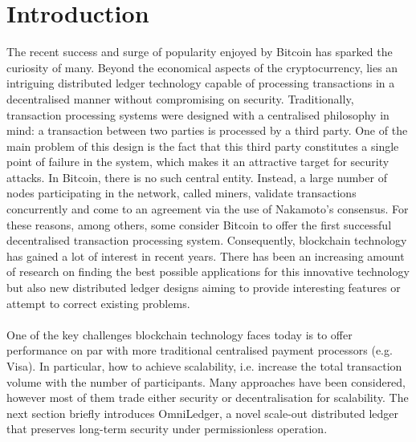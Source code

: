 \section{Introduction} \label{intro}
The recent success and surge of popularity enjoyed by Bitcoin has sparked the curiosity of many. Beyond the economical aspects of the cryptocurrency, lies an intriguing distributed ledger technology capable of processing transactions in a decentralised manner without compromising on security. Traditionally, transaction processing systems were designed with a centralised philosophy in mind: a transaction between two parties is processed by a third party. One of the main problem of this design is the fact that this third party constitutes a single point of failure in the system, which makes it an attractive target for security attacks. In Bitcoin, there is no such central entity. Instead, a large number of nodes participating in the network, called miners, validate transactions concurrently and come to an agreement via the use of Nakamoto's consensus. For these reasons, among others, some consider Bitcoin to offer the first successful decentralised transaction processing system.
Consequently, blockchain technology has gained a lot of interest in recent years. There has been an increasing amount of research on finding the best possible applications for this innovative technology but also new distributed ledger designs aiming to provide interesting features or attempt to correct existing problems. \\\\
One of the key challenges blockchain technology faces today is to offer performance on par with more traditional centralised payment processors (e.g. Visa). In particular, how to achieve scalability, i.e. increase the total transaction volume with the number of participants. Many approaches have been considered, however most of them trade either security or decentralisation for scalability. The next section briefly introduces OmniLedger\cite{kokoris-kogias_omniledger:_2018}, a novel scale-out distributed ledger that preserves long-term security under permissionless operation.

